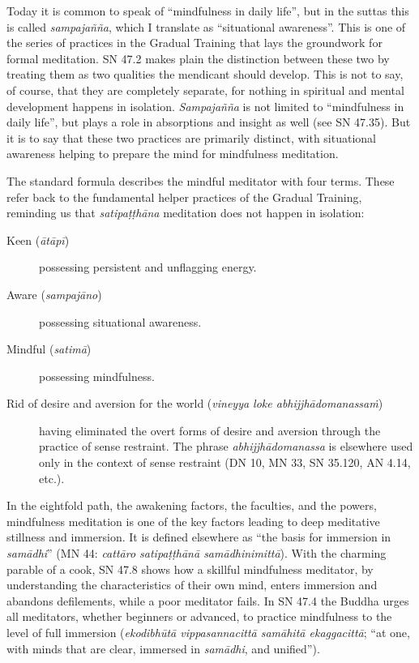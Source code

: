 \documentclass[12pt,openany]{book}%
\begin{document}
Today it is common to speak of “mindfulness in daily life”, but in the suttas this is called \textit{\textsanskrit{sampajañña}}, which I translate as “situational awareness”. This is one of the series of practices in the Gradual Training that lays the groundwork for formal meditation. SN 47.2 makes plain the distinction between these two by treating them as two qualities the mendicant should develop. This is not to say, of course, that they are completely separate, for nothing in spiritual and mental development happens in isolation. \textit{\textsanskrit{Sampajañña}} is not limited to “mindfulness in daily life”, but plays a role in absorptions and insight as well (see SN 47.35). But it is to say that these two practices are primarily distinct, with situational awareness helping to prepare the mind for mindfulness meditation.

The standard formula describes the mindful meditator with four terms. These refer back to the fundamental helper practices of the Gradual Training, reminding us that \textit{\textsanskrit{satipaṭṭhāna}} meditation does not happen in isolation:

\begin{description}%
\item[Keen (\textit{\textsanskrit{ātāpī}})] possessing persistent and unflagging energy.%
\item[Aware (\textit{\textsanskrit{sampajāno}})] possessing situational awareness.%
\item[Mindful (\textit{\textsanskrit{satimā}})] possessing mindfulness.%
\item[Rid of desire and aversion for the world (\textit{vineyya loke \textsanskrit{abhijjhādomanassaṁ}})] having eliminated the overt forms of desire and aversion through the practice of sense restraint. The phrase \textit{\textsanskrit{abhijjhādomanassa}} is elsewhere used only in the context of sense restraint (DN 10, MN 33, SN 35.120, AN 4.14, etc.).%
\end{description}

In the eightfold path, the awakening factors, the faculties, and the powers, mindfulness meditation is one of the key factors leading to deep meditative stillness and immersion. It is defined elsewhere as “the basis for immersion in \textit{\textsanskrit{samādhi}}” (MN 44: \textit{\textsanskrit{cattāro} \textsanskrit{satipaṭṭhānā} \textsanskrit{samādhinimittā}}). With the charming parable of a cook, SN 47.8 shows how a skillful mindfulness meditator, by understanding the characteristics of their own mind, enters immersion and abandons defilements, while a poor meditator fails. In SN 47.4 the Buddha urges all meditators, whether beginners or advanced, to practice mindfulness to the level of full immersion (\textit{\textsanskrit{ekodibhūtā} \textsanskrit{vippasannacittā} \textsanskrit{samāhitā} \textsanskrit{ekaggacittā}}; “at one, with minds that are clear, immersed in \textit{\textsanskrit{samādhi}}, and unified”).
\end{document}
